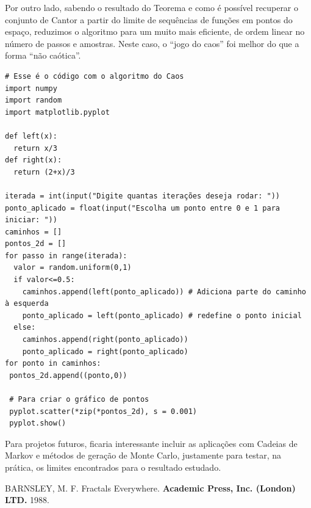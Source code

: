 \documentclass[12pt]{article}
\theoremstyle{definition}
\begin{document}
Por outro lado, sabendo o resultado do Teorema e como é possível recuperar o conjunto de Cantor a partir do limite de sequências de funções em pontos do espaço, reduzimos o algoritmo para um muito mais eficiente, de ordem linear no número de passos e amostras. Neste caso, o ``jogo do caos'' foi melhor do que a forma ``não caótica''.
\begin{verbatim}
# Esse é o código com o algoritmo do Caos
import numpy 
import random
import matplotlib.pyplot

def left(x):
  return x/3 
def right(x):
  return (2+x)/3 

iterada = int(input("Digite quantas iterações deseja rodar: ")) 
ponto_aplicado = float(input("Escolha um ponto entre 0 e 1 para iniciar: ")) 
caminhos = [] 
pontos_2d = [] 
for passo in range(iterada): 
  valor = random.uniform(0,1)
  if valor<=0.5:
    caminhos.append(left(ponto_aplicado)) # Adiciona parte do caminho à esquerda
    ponto_aplicado = left(ponto_aplicado) # redefine o ponto inicial
  else: 
    caminhos.append(right(ponto_aplicado)) 
    ponto_aplicado = right(ponto_aplicado) 
for ponto in caminhos:
 pontos_2d.append((ponto,0)) 

 # Para criar o gráfico de pontos
 pyplot.scatter(*zip(*pontos_2d), s = 0.001)
 pyplot.show()
\end{verbatim}
Para projetos futuros, ficaria interessante incluir as aplicações com Cadeias de Markov e métodos de geração de Monte Carlo, justamente para testar, na prática, os limites encontrados para o resultado estudado.

\begin{thebibliography}{99}
	 BARNSLEY, M. F. Fractals Everywhere. \textbf{Academic Press, Inc. (London) LTD.} 1988.
\end{thebibliography}
\end{document}

